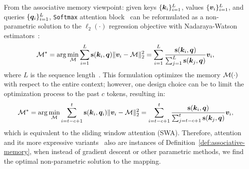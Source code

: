 { From the associative memory viewpoint: given keys $\{\boldsymbol{k}_i\}_{i=1}^{L}$, values $\{\boldsymbol{v}_i\}_{i=1}^{L}$, and queries $\{\boldsymbol{q}_i\}_{i=1}^{L}$, \texttt{Softmax} attention block~\citep{bahdanau2014neural, transformers} can be reformulated as a non-parametric  solution to the $\ell_2(\cdot)$ regression objective with  Nadaraya-Watson estimators~\citep{zhang2022analysis, fan2018local}:
\begin{align}\label{eq:attention-nadaraya}
    \mathcal{M}^* = \arg\min_{\mathcal{M}} \sum_{i = 1}^{L} \mathbf{s}(\boldsymbol{k}_i, \boldsymbol{q}) \|\boldsymbol{v}_i - \mathcal{M} \|^2_2
    = \sum_{i = 1}^{L} \frac{\mathbf{s}(\boldsymbol{k}_i, \boldsymbol{q})}{\sum_{j = 1}^{L} \mathbf{s}(\boldsymbol{k}_j, \boldsymbol{q})} \boldsymbol{v}_i,
\end{align}
where $L$ is the sequence length~\citep{sun2024learning}. This formulation optimizes the memory $\mathcal{M}(\cdot)$ with respect to the entire context; however, one design choice can be to limit the optimization process to the past $c$ tokens, resulting in:
\begin{align}
    \mathcal{M}^* = \arg\min_{\mathcal{M}} \sum_{i = t - c + 1}^{t} \mathbf{s}(\boldsymbol{k}_i, \boldsymbol{q}_i) \|\boldsymbol{v}_i - \mathcal{M} \|^2_2  = \sum_{i = t-c + 1}^{t} \frac{\mathbf{s}(\boldsymbol{k}_i, \boldsymbol{q})}{\sum_{j = t - c + 1}^{t} \mathbf{s}(\boldsymbol{k}_j, \boldsymbol{q})} \boldsymbol{v}_i, 
\end{align}
which is equivalent to the sliding window attention (SWA). Therefore, attention and its more expressive variants~\citep{wang2025test} also are instances of Definition~\ref{def:associative-memory}, when instead of gradient descent or other parametric methods, we find the optimal non-parametric solution to the mapping. 

}
